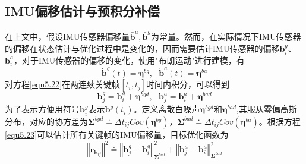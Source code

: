 \subsection{IMU偏移估计与预积分补偿}
在上文中，假设IMU传感器偏移量${\bar{\boldsymbol{b}}^a, \bar{\boldsymbol{b}}^g}$为常量。然而，在实际情况下IMU传感器的偏移在状态估计与优化过程中是变化的，因而需要估计IMU传感器的偏移$\boldsymbol{b}_i^g$、$\boldsymbol{b}_i^a$，对于IMU传感器的偏移的变化，使用"布朗运动"进行建模，有
\begin{equation}
\label{equ5.22}
\dot{\boldsymbol{b}}^g(t) = \boldsymbol{\eta}^{bg}, \ \ \ \dot{\boldsymbol{b}}^a(t) = \boldsymbol{\eta}^{ba}
\end{equation}
对方程\eqref{equ5.22}在两连续关键帧$[t_i,t_j]$时间内积分，可以得到
\begin{equation}
\label{equ5.23}
\boldsymbol{b}_j^g = \boldsymbol{b}_i^g+\boldsymbol{\eta}^{bgd}, \ \ \ \boldsymbol{b}_j^a = \boldsymbol{b}_i^a+\boldsymbol{\eta}^{bad}
\end{equation}
为了表示方便用符号$\boldsymbol{b}_i^g$表示$\boldsymbol{b}^g(t_i)$。定义离散白噪声$\boldsymbol{\eta}^{bgd}$和$\boldsymbol{\eta}^{bad}$,其服从零偏高斯分布，对应的协方差为$\boldsymbol{\Sigma}^{bgd} \doteq \Delta t_{ij} Cov(\boldsymbol{\eta}^{bg}) $，$\boldsymbol{\Sigma}^{bad} \doteq \Delta t_{ij} Cov(\boldsymbol{\eta}^{ba})$。根据方程\eqref{equ5.23}可以估计所有关键帧的IMU偏移量，目标优化函数为
\begin{equation}
\label{equ5.24}
\left\Vert \boldsymbol{r}_{\boldsymbol{b}_{ij}} \right\Vert ^2 \doteq \left\Vert \boldsymbol{b}_j^g -\boldsymbol{b}_i^g \right\Vert_{\boldsymbol{\Sigma}^{bgd}}^2 + \left\Vert \boldsymbol{b}_j^a -\boldsymbol{b}_i^a \right\Vert_{\boldsymbol{\Sigma}^{bad}}^2
\end{equation}


